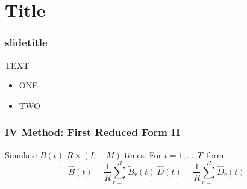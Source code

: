                       

%
%

\section[crossref]{Title}

\begin{frame}[allowframebreaks]%

\frametitle{slidetitle} TEXT

\begin{itemize}
\item ONE

\item TWO
\end{itemize}

\end{frame}%

\begin{frame}[allowframebreaks]%

\frametitle{IV Method: First Reduced Form II}

Simulate $B(t)$ $R\times \left( L+M\right) $ times. For $t=1,\ldots ,T$\ form%
\begin{equation*}
\hat{B}\left( t\right) =\frac{1}{R}\sum_{r=1}^{R}\tilde{B}_{r}\left(
t\right) \ \hat{D}\left( t\right) =\frac{1}{R}\sum_{r=1}^{R}\hat{D}%
_{r}\left( t\right) 
\end{equation*}

\end{frame}%

